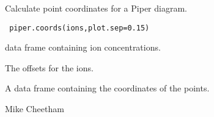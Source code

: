 \begin{Description}\relax
Calculate point coordinates for a Piper diagram.
\end{Description}
\begin{Usage}
\begin{verbatim}
 piper.coords(ions,plot.sep=0.15)
\end{verbatim}
\end{Usage}
\begin{Arguments}
\begin{ldescription}
\item[\code{ions}] data frame containing ion concentrations.
\item[\code{plot.sep}] The offsets for the ions.
\end{ldescription}
\end{Arguments}
\begin{Value}
A data frame containing the coordinates of the points.
\end{Value}
\begin{Author}\relax
Mike Cheetham
\end{Author}
\begin{SeeAlso}\relax
{}
\end{SeeAlso}

